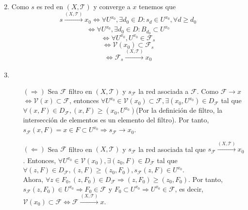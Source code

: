 \begin{dem}
  \begin{enumerate}[label=(\roman*)]
    \item []
    \item Como $s$ es red en $( X, \mathcal{T} )$ y converge a $x$ tenemos que
      \[
        s \xrightarrow[]{ ( X, \mathcal{T} ) } x_{0} \Leftrightarrow \forall U^{x_{0}}, \exists d_{0} \in D : s_{d} \in U^{x_{0}}, \forall d \geq d_{0}
      \]
      \[
        \Leftrightarrow \forall U^{x_{0}}, \exists d_{0} \in D : B_{d_{0}} \subset U^{x_{0}}
      \]
      \[ 
        \Leftrightarrow \forall U^{x_{0}}, U^{x_{0}} \in \mathcal{F}_{s}
      \] 
      \[ 
        \Leftrightarrow \mathcal{V}(x_{0})  \subset \mathcal{F}_{s}
      \] 
      \[ 
        \Leftrightarrow \mathcal{F}_{s} \xrightarrow[]{ ( X, \mathcal{T} ) } x_{0}
      \] 
    \item 
      \begin{enumerate}[label=(\roman*)]
        \item []
        \item [$(\Rightarrow)$] Sea $\mathcal{F}$ filtro en $( X, \mathcal{T} )$ y $s_{\mathcal{F}}$ la red asociada a $\mathcal{F}$. Como $\mathcal{F} \rightarrow x$ $\Leftrightarrow \mathcal{V}(x) \subset \mathcal{F}$, entonces $\forall U^{x_{0}} \in \mathcal{V}(x_{0}) \subset \mathcal{F}, \exists (x_{0}, U^{x_{0}}) \in D_{\mathcal{F}}$ tal que $\forall (x, F) \in D_{\mathcal{F}}, (x, F) \geq (x_{0}, U^{x_{0}})$(Por la definición de filtro, la intersección de elementos es un elemento del filtro). Por tanto, $s_{\mathcal{F}}(x, F) = x \in F \subset U^{x_{0}} \Rightarrow s_{\mathcal{F}} \rightarrow x_{0}$.

        \item [$(\Leftarrow)$] Sea $\mathcal{F}$ filtro en $( X, \mathcal{T} )$ y $s_{\mathcal{F}}$ la red asociada tal que $s_{\mathcal{F}} \xrightarrow[]{ ( X, \mathcal{T} ) } x_{0}$. Entonces, $\forall U^{x_{0}} \in \mathcal{V}(x_{0}), \exists (z_{0}, F) \in D_{\mathcal{F}}$ tal que $\forall (z, F) \in D_{\mathcal{F}}, (z, F) \geq (z_{0}, F_{0}), s_{\mathcal{F}}(z, F) \in U^{x_{0}}$. \\

          Ahora, $\forall z \in F_{0}, (z, F_{0}) \in D_{\mathcal{F}} \Rightarrow (z, F_{0}) \geq (z_{0}, F_{0})$. Por tanto, $s_{\mathcal{F}}(z, F_{0}) \in U^{x_{0}} \Rightarrow F_{0} \in \mathcal{F}$ y $F_{0} \subset U^{x_{0}} \Rightarrow U^{x_{0}} \in \mathcal{F}$, es decir, $\mathcal{V}(x_{0}) \subset \mathcal{F} \Leftrightarrow \mathcal{F} \xrightarrow[]{ ( X, \mathcal{T} ) } x$.
      \end{enumerate}
  \end{enumerate}
\end{dem}
